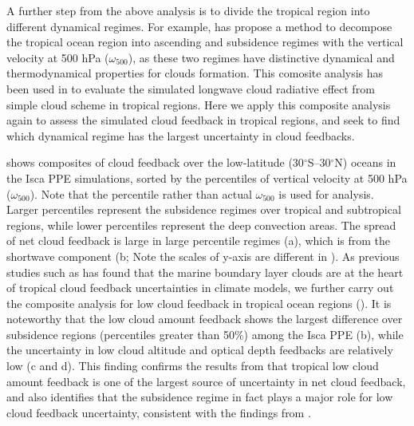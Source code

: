 A further step from the above analysis is to divide the tropical region into different dynamical regimes. For example, \cite{Bony2004} has propose a method to decompose the tropical ocean region into ascending and subsidence regimes with the vertical velocity at 500 hPa ($\omega_{500}$), as these two regimes have distinctive dynamical and thermodynamical properties for clouds formation. This comosite analysis has been used in  to evaluate the simulated longwave cloud radiative effect from simple cloud scheme in tropical regions. Here we apply this composite analysis again to assess the simulated cloud feedback in tropical regions, and seek to find which dynamical regime has the largest uncertainty in cloud feedbacks.

 shows composites of cloud feedback over the low-latitude (30$^\circ$S--30$^\circ$N) oceans in the Isca PPE simulations, sorted by the percentiles of vertical velocity at 500 hPa ($\omega_{500}$). Note that the percentile rather than actual $\omega_{500}$ is used for analysis. Larger percentiles represent the subsidence regimes over tropical and subtropical regions, while lower percentiles represent the deep convection areas. The spread of net cloud feedback is large in large percentile regimes (a), which is from the shortwave component (b; Note the scales of y-axis are different in ). As previous studies such as \cite{Bony2005} has found that the marine boundary layer clouds are at the heart of tropical cloud feedback uncertainties in climate models, we further carry out the composite analysis for low cloud feedback in tropical ocean regions (). It is noteworthy that the low cloud amount feedback shows the largest difference  over subsidence regions (percentiles greater than 50\%) among the Isca PPE (b), while the uncertainty in low cloud altitude and optical depth feedbacks are relatively low (c and d). This finding confirms the results from  that tropical low cloud amount feedback is one of the largest source of uncertainty in net cloud feedback, and also identifies that the subsidence regime in fact plays a major role for low cloud feedback uncertainty, consistent with the findings from \cite{Bony2005}.

